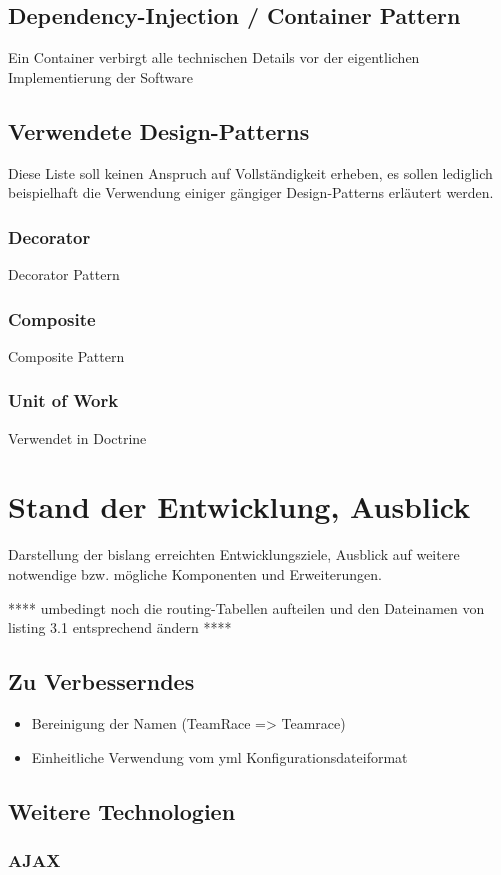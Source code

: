 \documentclass[12pt]{report}
\begin{document}
\section{Dependency-Injection / Container Pattern}
Ein Container verbirgt alle technischen Details vor der eigentlichen Implementierung der Software
\section{Verwendete Design-Patterns}
Diese Liste soll keinen Anspruch auf Vollständigkeit erheben, es sollen lediglich beispielhaft die Verwendung einiger gängiger Design-Patterns erläutert werden.
\subsection{Decorator}
Decorator Pattern
\subsection{Composite}
Composite Pattern
\subsection{Unit of Work}
Verwendet in Doctrine \cite{ab94} 




\chapter{Stand der Entwicklung, Ausblick}
Darstellung der bislang erreichten Entwicklungsziele, Ausblick auf weitere notwendige bzw. mögliche Komponenten und Erweiterungen.


**** umbedingt noch die routing-Tabellen aufteilen und den Dateinamen von listing 3.1 entsprechend ändern ****


\section{Zu Verbesserndes}

\begin{itemize}
\item{Bereinigung der Namen (TeamRace => Teamrace)}
\item{Einheitliche Verwendung vom yml Konfigurationsdateiformat}
\end{itemize}

\section{Weitere Technologien}

\subsection{AJAX}
\label{sec:AJAX}




\end{document}
